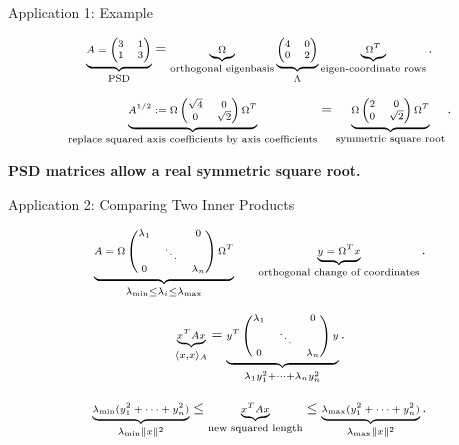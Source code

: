 \documentclass[10pt]{beamer}
\theoremstyle{definition}
\newcommand{\x}[1]{\alert{\textbf{#1}}}
\begin{document}
\begin{frame}[shrink=8]{Application 1: Example}

\[
\scriptsize
\underbrace{
A=
\begin{pmatrix}
3&1\\
1&3
\end{pmatrix}}_{\text{PSD}}
=
\underbrace{
\Omega}_{\text{orthogonal eigenbasis}}
\underbrace{
\begin{pmatrix}
4&0\\
0&2
\end{pmatrix}}_{\Lambda}
\underbrace{\Omega^T}_{\text{eigen-coordinate rows}}.
\]

\vfill

\[
\scriptsize
\underbrace{
A^{1/2}
:=
\Omega
\begin{pmatrix}
\sqrt4&0\\
0&\sqrt2
\end{pmatrix}
\Omega^T}_{\text{replace squared axis coefficients by axis coefficients}}
=
\underbrace{
\Omega
\begin{pmatrix}
2&0\\
0&\sqrt2
\end{pmatrix}
\Omega^T}_{\text{symmetric square root}}.
\]

\vfill

\begin{center}
\x{PSD matrices allow a real symmetric square root.}
\end{center}

\end{frame}


\begin{frame}[shrink=10]{Application 2: Comparing Two Inner Products}

\[
\scriptsize
\underbrace{A=
\Omega
\begin{pmatrix}
\lambda_1&&0\\
&\ddots&\\
0&&\lambda_n
\end{pmatrix}
\Omega^T}_{\lambda_{\min}\le\lambda_i\le\lambda_{\max}}
\qquad
\underbrace{y=\Omega^Tx}_{\text{orthogonal change of coordinates}}.
\]

\vfill

\[
\scriptsize
\underbrace{x^TAx}_{\langle x,x\rangle_A}
=
\underbrace{y^T
\begin{pmatrix}
\lambda_1&&0\\
&\ddots&\\
0&&\lambda_n
\end{pmatrix}
y}_{\lambda_1y_1^2+\cdots+\lambda_ny_n^2}.
\]

\vfill

\[
\scriptsize
\underbrace{\lambda_{\min}(y_1^2+\cdots+y_n^2)}_{\lambda_{\min}\|x\|^2}
\le
\underbrace{x^TAx}_{\text{new squared length}}
\le
\underbrace{\lambda_{\max}(y_1^2+\cdots+y_n^2)}_{\lambda_{\max}\|x\|^2}.
\]

\end{frame}
\end{document}
